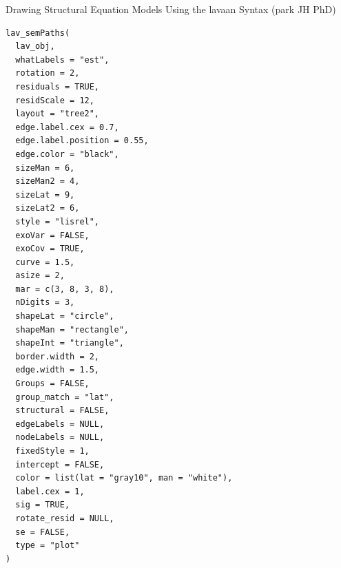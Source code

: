 \documentclass[a4paper]{book}
\begin{document}
%
\begin{Description}
Drawing Structural Equation Models Using the lavaan Syntax (park JH PhD)
\end{Description}
%
\begin{Usage}
\begin{verbatim}
lav_semPaths(
  lav_obj,
  whatLabels = "est",
  rotation = 2,
  residuals = TRUE,
  residScale = 12,
  layout = "tree2",
  edge.label.cex = 0.7,
  edge.label.position = 0.55,
  edge.color = "black",
  sizeMan = 6,
  sizeMan2 = 4,
  sizeLat = 9,
  sizeLat2 = 6,
  style = "lisrel",
  exoVar = FALSE,
  exoCov = TRUE,
  curve = 1.5,
  asize = 2,
  mar = c(3, 8, 3, 8),
  nDigits = 3,
  shapeLat = "circle",
  shapeMan = "rectangle",
  shapeInt = "triangle",
  border.width = 2,
  edge.width = 1.5,
  Groups = FALSE,
  group_match = "lat",
  structural = FALSE,
  edgeLabels = NULL,
  nodeLabels = NULL,
  fixedStyle = 1,
  intercept = FALSE,
  color = list(lat = "gray10", man = "white"),
  label.cex = 1,
  sig = TRUE,
  rotate_resid = NULL,
  se = FALSE,
  type = "plot"
)
\end{verbatim}
\end{Usage}
%
\end{document}
